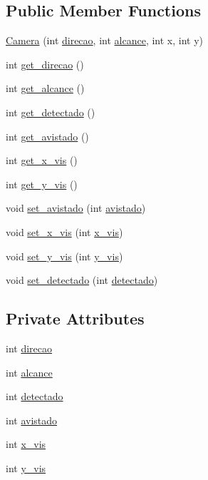 \subsection*{Public Member Functions}
\begin{DoxyCompactItemize}
\item 
\hyperlink{classCamera_a297e1aba987f8418a355522e5a8b2f77}{Camera} (int \hyperlink{classCamera_a82594c03b409a1670e19f317e7d0e343}{direcao}, int \hyperlink{classCamera_a310e25ede9cb3f797c18fcecd7fef8fd}{alcance}, int x, int y)
\item 
int \hyperlink{classCamera_afd13cc91a3ce9a4d4d6b6dbb622ce7a4}{get\+\_\+direcao} ()
\item 
int \hyperlink{classCamera_a4603e48179e827b04679fce1f485dde1}{get\+\_\+alcance} ()
\item 
int \hyperlink{classCamera_a3b6202883eadc2e3b94f4cd1a2929111}{get\+\_\+detectado} ()
\item 
int \hyperlink{classCamera_a9a87643bf6bde3ca94b8f51f66e85574}{get\+\_\+avistado} ()
\item 
int \hyperlink{classCamera_a7b38e3e530865054f4425add99421f96}{get\+\_\+x\+\_\+vis} ()
\item 
int \hyperlink{classCamera_ad4ed7f3d1e12fc637ae8bbe9fad08430}{get\+\_\+y\+\_\+vis} ()
\item 
void \hyperlink{classCamera_a8f9f20cce133ec8f429f56e805ba1510}{set\+\_\+avistado} (int \hyperlink{classCamera_a2a0363d549c23561ba3c31e96244e00a}{avistado})
\item 
void \hyperlink{classCamera_abf6eb324c8d3900835e542a5ff5f9d43}{set\+\_\+x\+\_\+vis} (int \hyperlink{classCamera_ab817fd4f5ccb70d3d90b07fa4334c70b}{x\+\_\+vis})
\item 
void \hyperlink{classCamera_aea3c7f010360c4fe13ac738be2ea9027}{set\+\_\+y\+\_\+vis} (int \hyperlink{classCamera_a52e161a09b8e26feb580cc1740abcdad}{y\+\_\+vis})
\item 
void \hyperlink{classCamera_a809224178bedeb0b951891f91c0a5f58}{set\+\_\+detectado} (int \hyperlink{classCamera_a07b38e39acc6d3f808a27f0ddf2c79e2}{detectado})
\end{DoxyCompactItemize}
\subsection*{Private Attributes}
\begin{DoxyCompactItemize}
\item 
int \hyperlink{classCamera_a82594c03b409a1670e19f317e7d0e343}{direcao}
\item 
int \hyperlink{classCamera_a310e25ede9cb3f797c18fcecd7fef8fd}{alcance}
\item 
int \hyperlink{classCamera_a07b38e39acc6d3f808a27f0ddf2c79e2}{detectado}
\item 
int \hyperlink{classCamera_a2a0363d549c23561ba3c31e96244e00a}{avistado}
\item 
int \hyperlink{classCamera_ab817fd4f5ccb70d3d90b07fa4334c70b}{x\+\_\+vis}
\item 
int \hyperlink{classCamera_a52e161a09b8e26feb580cc1740abcdad}{y\+\_\+vis}
\end{DoxyCompactItemize}

